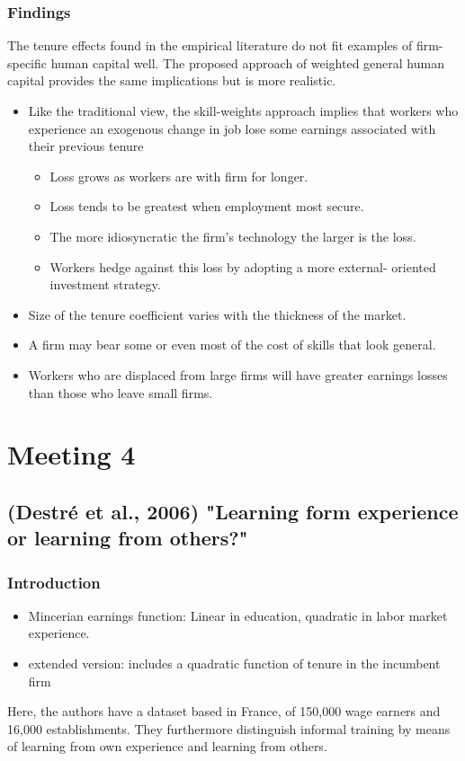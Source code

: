 \documentclass[12pt,a4paper]{article}
\begin{document}
  \subsubsection{Findings}

    The tenure effects found in the empirical literature do not fit examples of firm-specific human capital well. The proposed approach of weighted general human capital provides the same implications but is more realistic.
    \begin{itemize}
      \item Like the traditional view, the skill-weights approach implies that workers who experience an exogenous change in job lose some earnings associated with their previous tenure
        \begin{itemize}
          \item Loss grows as workers are with firm for longer.
          \item Loss tends to be greatest when employment most secure.
          \item The more idiosyncratic the firm's technology the larger is the loss.
          \item Workers hedge against this loss by adopting a more external- oriented investment strategy.
        \end{itemize}
      \item Size of the tenure coefficient varies with the thickness of the market.
      \item A firm may bear some or even most of the cost of skills that look general.
      \item Workers who are displaced from large firms will have greater earnings losses than those who leave small firms.
    \end{itemize}

  \section{Meeting 4} %
  \label{prt:Meeting 4}
  \subsection{(Destré et al., 2006) "Learning form experience or learning from others?"} %
  \label{sec:Destré et al., 2006}
  \setcounter{equation}{0}
  \subsubsection{Introduction} %
  \label{ssub:Introduction}
  \begin{itemize}
    \item Mincerian earnings function: Linear in education, quadratic in labor market experience.
    \item extended version: includes a quadratic function of tenure in the incumbent firm
  \end{itemize}
  Here, the authors have a dataset based in France, of 150,000 wage earners and 16,000
  establishments. They furthermore distinguish informal training by means of learning from own
  experience and learning from others.
\end{document}

